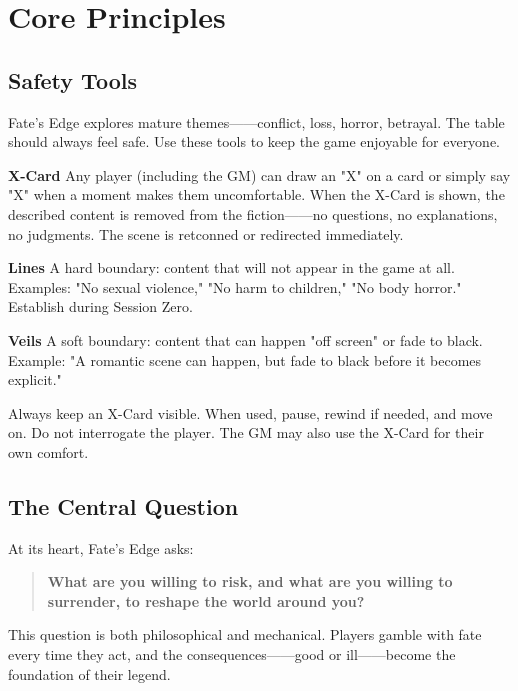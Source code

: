 
\chapter{Core Principles}\label{chap:core_principles}

\section{Safety Tools}\label{sec:safety_tools}

Fate's Edge explores mature themes------conflict, loss, horror, betrayal. The table should always feel safe. Use these tools to keep the game enjoyable for everyone.

\begin{tcolorbox}[title=Safety Tools: Lines, Veils \& X-Card, colback=red!5!white, colframe=red!75!black, sharp corners,breakable]
\textbf{X-Card} Any player (including the GM) can draw an "X" on a card or simply say "X" when a moment makes them uncomfortable. When the X-Card is shown, the described content is removed from the fiction------no questions, no explanations, no judgments. The scene is retconned or redirected immediately.

\textbf{Lines} A hard boundary: content that will not appear in the game at all. Examples: "No sexual violence," "No harm to children," "No body horror." Establish during Session Zero.

\textbf{Veils} A soft boundary: content that can happen "off screen" or fade to black. Example: "A romantic scene can happen, but fade to black before it becomes explicit."  
\end{tcolorbox}

Always keep an X-Card visible. When used, pause, rewind if needed, and move on. Do not interrogate the player. The GM may also use the X-Card for their own comfort.

\section{The Central Question}\label{sec:central_question}

At its heart, Fate's Edge asks:
\begin{quote}
\textbf{What are you willing to risk, and what are you willing to surrender, to reshape the world around you?}
\end{quote}
This question is both philosophical and mechanical. Players gamble with fate every time they act, and the consequences------good or ill------become the foundation of their legend.

